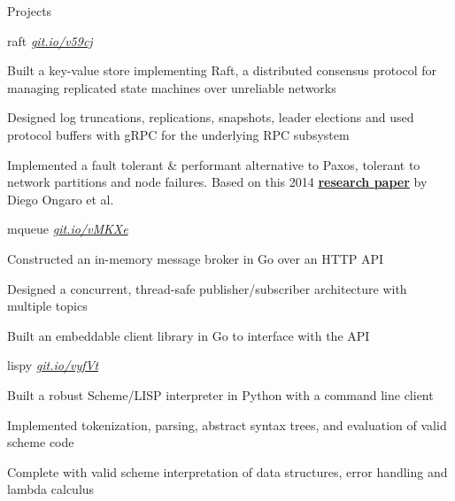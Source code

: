 \documentclass{resume} %
\begin{document}
\begin{rSection}{Projects}
  
  \begin{rSubsection}{raft}
	  {\em {\href{http://github.com/ridwanmsharif/raft}
		    {git.io/v59cj}}}
	  {}
    \item Built a key-value store implementing Raft, a distributed consensus
      protocol for managing replicated state machines over unreliable
      networks
    \item Designed log truncations, replications, snapshots, leader elections
      and used protocol buffers with gRPC for the underlying RPC subsystem
    \item Implemented a fault tolerant \& performant alternative to Paxos, tolerant to
      network partitions and node failures. Based on this  2014
      \href{https://raft.github.io/raft.pdf}{\textbf{research paper}} by Diego
      Ongaro et al.
      
  \end{rSubsection}

  \begin{rSubsection}{mqueue}
	  {\em {\href{http://github.com/ridwanmsharif/mqueue}
		    {git.io/vMKXe}}}
	  {}

    \item Constructed an in-memory message broker in Go over an HTTP API
    \item Designed a concurrent, thread-safe publisher/subscriber architecture
      with multiple topics
    \item Built an embeddable client library in Go to interface with the API
        
  \end{rSubsection}

  \begin{rSubsection}{lispy}
	  {\em {\href{http://github.com/ridwanmsharif/lispy}
		    {git.io/vyfVt}}}
	  {}

    \item Built a robust Scheme/LISP interpreter in Python with a command line
      client
    \item Implemented tokenization, parsing, abstract syntax trees, and
      evaluation of valid scheme code
    \item Complete with valid scheme interpretation of data structures, error
      handling and lambda calculus
        

\end{rSubsection}
\end{rSection}
\end{document}
